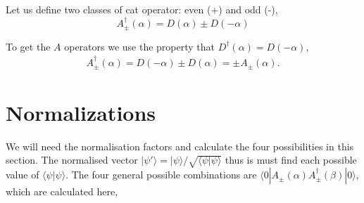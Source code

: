\documentclass[aps,prl,twocolumn,amsmath,amssymb,nofootinbib,superscriptaddress]{revtex4}
\newcommand{\bra}[1]{\langle#1|}
\newcommand{\ket}[1]{|#1\rangle}
\newcommand{\ip}[2]{\langle{#1}|{#2}\rangle}
\begin{document}
Let us define two classes of cat operator: even (+) and odd (-),
\begin{equation}
A^\dag_\pm(\alpha) = D(\alpha) \pm D(-\alpha)
\end{equation}

To get the $A$ operators we use the property that $D^{\dag}(\alpha)=D(-\alpha)$,
\begin{eqnarray}
A_{\pm}^\dag(\alpha) =D(-\alpha)\pm D(\alpha) = \pm A_\pm(\alpha).
\end{eqnarray}

\section{Normalizations}

We will need the normalisation factors and calculate the four possibilities in this section. The normalised vector $\ket{\psi'}= \ket{\psi}/ \sqrt{\ip{\psi}{\psi}}$ thus is must find each possible value of $\ip{\psi}{\psi}$. The four general possible combinations are $\bra{0}A_\pm(\alpha)A^\dag_\pm(\beta)\ket{0}$, which are calculated here,
\end{document}
